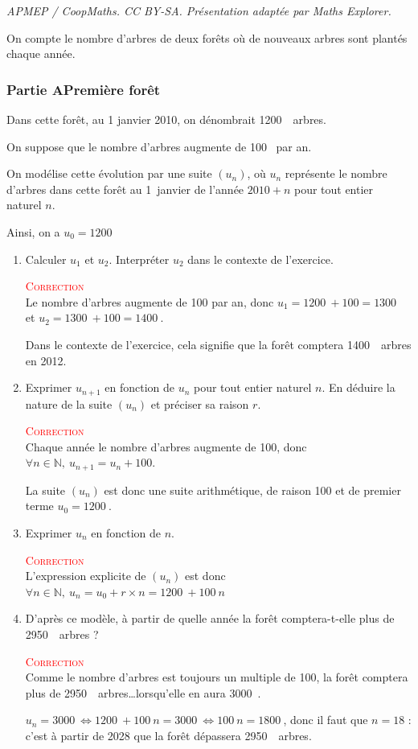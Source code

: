 \documentclass[10pt]{article}
\providecommand{\N}{\mathbb{N}}
\providecommand{\np}[2][]{{#2~#1}}
\begin{document}
\noindent\textit{APMEP / CoopMaths. CC BY-SA. Présentation adaptée par Maths Explorer.}\par\medskip
On compte le nombre d'arbres de deux forêts où de nouveaux arbres sont plantés chaque année.

\subsubsection*{Partie A\hspace{10mm}Première forêt}

Dans cette forêt, au 1 janvier 2010, on dénombrait \np{1200}~arbres.

On suppose que le nombre d'arbres augmente de \np{100} par an.

On modélise cette évolution par une suite \mbox{$(u_n)$}, où $u_n$ représente le nombre d'arbres dans cette forêt au 1~janvier de l'année \mbox{$2010+n$} pour tout entier naturel $n$.

Ainsi, on a \mbox{$u_0=\np{1200}$}
\begin{enumerate}
	\item Calculer $u_1$ et $u_2$. Interpréter $u_2$ dans le contexte de l'exercice.


	\textcolor{red}{\textsc{Correction}}\\
	Le nombre d'arbres augmente de 100 par an, donc \mbox{$u_1=\np{1200}+100=\np{1300}$}  et \mbox{$u_2=\np{1300}+100=\np{1400}$}.

	Dans le contexte de l'exercice, cela signifie que la forêt comptera \np{1400}~arbres en 2012.
	\item Exprimer \mbox{$u_{n+1}$} en fonction de $u_n$ pour tout entier naturel $n$. En déduire la nature de la suite $(u_n)$ et préciser sa raison $r$.


	\textcolor{red}{\textsc{Correction}}\\
	Chaque année le nombre d'arbres augmente de 100, donc \mbox{$\forall n \in \N,~ u_{n+1}=u_n + 100$}.

	La suite $(u_n)$ est donc une suite arithmétique, de raison 100 et de premier terme \mbox{$u_0=\np{1200}$}.
		\item Exprimer $u_n$ en fonction de $n$.


		\textcolor{red}{\textsc{Correction}}\\
		L'expression explicite de $(u_n)$ est donc  \mbox{$\forall n \in \N,~ u_n=u_0 +r\times n= \np{1200} + 100~n$}
	\item D'après ce modèle, à partir de quelle année la forêt comptera-t-elle plus de \np{2950}~arbres ?

		\textcolor{red}{\textsc{Correction}}\\
		Comme le nombre d'arbres est toujours un multiple de 100, la forêt comptera plus de \np{2950}~arbres\dots lorsqu'elle en aura \np{3000}.

		\mbox{$u_n=\np{3000}\iff \np{1200}+100~n=\np{3000}\iff 100~n=\np{1800}$}, donc il faut que \mbox{$n=18$} : c'est à partir de 2028 que la forêt dépassera \np{2950}~arbres.
\end{enumerate}
\end{document}
